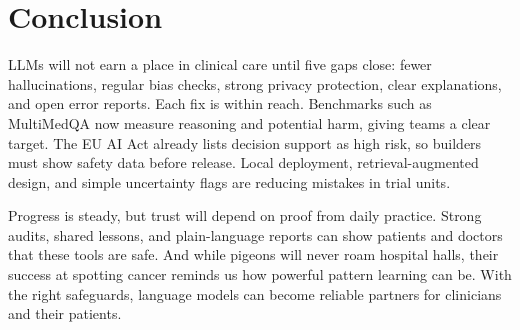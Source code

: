 \documentclass[12pt,a4paper]{scrreprt}
\begin{document}
\section*{Conclusion}
LLMs will not earn a place in clinical care until five gaps close: fewer hallucinations, regular bias checks, strong privacy protection, clear explanations, and open error reports. Each fix is within reach. Benchmarks such as MultiMedQA now measure reasoning and potential harm, giving teams a clear target. The EU AI Act already lists decision support as high risk, so builders must show safety data before release. Local deployment, retrieval-augmented design, and simple uncertainty flags are reducing mistakes in trial units.\par
\vspace{\baselineskip}
\noindent
Progress is steady, but trust will depend on proof from daily practice. Strong audits, shared lessons, and plain-language reports can show patients and doctors that these tools are safe. And while pigeons will never roam hospital halls, their success at spotting cancer reminds us how powerful pattern learning can be. With the right safeguards, language models can become reliable partners for clinicians and their patients.




\par
\vspace{\baselineskip}
\noindent

\printbibliography
\end{document}
